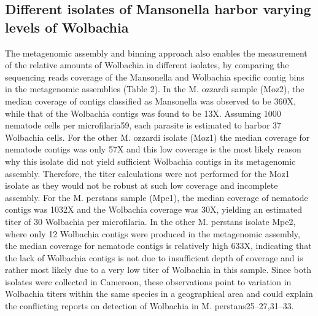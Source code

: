\documentclass[10pt, a4paper, twocolumn]{article} %
\begin{document}
\subsection{Different isolates of Mansonella harbor varying levels of Wolbachia}
The metagenomic assembly and binning approach also enables the measurement of the relative amounts of Wolbachia in different isolates, by comparing the sequencing reads coverage of the Mansonella and Wolbachia specific contig bins in the metagenomic assemblies (Table 2). In the M. ozzardi sample (Moz2), the median coverage of contigs classified as Mansonella was observed to be 360X, while that of the Wolbachia contigs was found to be 13X. Assuming 1000 nematode cells per microfilaria59, each parasite is estimated to harbor 37 Wolbachia cells. For the other M. ozzardi isolate (Moz1) the median coverage for nematode contigs was only 57X and this low coverage is the most likely reason why this isolate did not yield sufficient Wolbachia contigs in its metagenomic assembly. Therefore, the titer calculations were not performed for the Moz1 isolate as they would not be robust at such low coverage and incomplete assembly. For the M. perstans sample (Mpe1), the median coverage of nematode contigs was 1032X and the Wolbachia coverage was 30X, yielding an estimated titer of 30 Wolbachia per microfilaria. In the other M. perstans isolate Mpe2, where only 12 Wolbachia contigs were produced in the metagenomic assembly, the median coverage for nematode contigs is relatively high 633X, indicating that the lack of Wolbachia contigs is not due to insufficient depth of coverage and is rather most likely due to a very low titer of Wolbachia in this sample. Since both isolates were collected in Cameroon, these observations point to variation in Wolbachia titers within the same species in a geographical area and could explain the conflicting reports on detection of Wolbachia in M. perstans25–27,31–33. 
\end{document}
